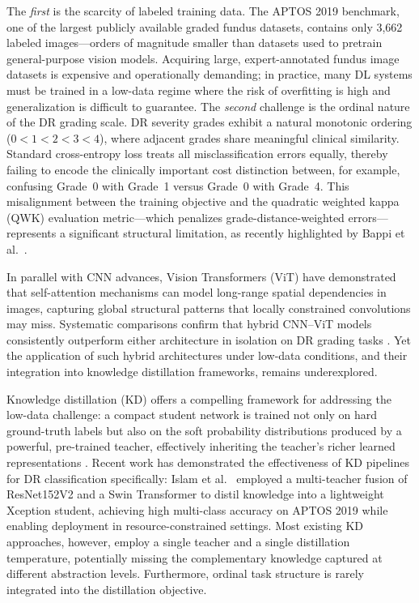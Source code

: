 \documentclass[a4paper,fleqn]{cas-dc}
\begin{document}
The \textit{first} is the scarcity of labeled training data. The APTOS 2019 benchmark, one of the largest publicly available graded fundus datasets, contains only 3,662 labeled images---orders of magnitude smaller than datasets used to pretrain general-purpose vision models. Acquiring large, expert-annotated fundus image datasets is expensive and operationally demanding; in practice, many DL systems must be trained in a low-data regime where the risk of overfitting is high and generalization is difficult to guarantee. The \textit{second} challenge is the ordinal nature of the DR grading scale. DR severity grades exhibit a natural monotonic ordering ($0 < 1 < 2 < 3 < 4$), where adjacent grades share meaningful clinical similarity. Standard cross-entropy loss treats all misclassification errors equally, thereby failing to encode the clinically important cost distinction between, for example, confusing Grade~0 with Grade~1 versus Grade~0 with Grade~4. This misalignment between the training objective and the quadratic weighted kappa (QWK) evaluation metric---which penalizes grade-distance-weighted errors---represents a significant structural limitation, as recently highlighted by Bappi et al.\ \cite{bappi2025}.

In parallel with CNN advances, Vision Transformers (ViT) \cite{dosovitskiy2021} have demonstrated that self-attention mechanisms can model long-range spatial dependencies in images, capturing global structural patterns that locally constrained convolutions may miss. Systematic comparisons confirm that hybrid CNN--ViT models consistently outperform either architecture in isolation on DR grading tasks \cite{zhang2025}. Yet the application of such hybrid architectures under low-data conditions, and their integration into knowledge distillation frameworks, remains underexplored.

Knowledge distillation (KD) offers a compelling framework for addressing the low-data challenge: a compact student network is trained not only on hard ground-truth labels but also on the soft probability distributions produced by a powerful, pre-trained teacher, effectively inheriting the teacher's richer learned representations \cite{hinton2015}. Recent work has demonstrated the effectiveness of KD pipelines for DR classification specifically: Islam et al.\ \cite{islam2023} employed a multi-teacher fusion of ResNet152V2 and a Swin Transformer to distil knowledge into a lightweight Xception student, achieving high multi-class accuracy on APTOS 2019 while enabling deployment in resource-constrained settings. Most existing KD approaches, however, employ a single teacher and a single distillation temperature, potentially missing the complementary knowledge captured at different abstraction levels. Furthermore, ordinal task structure is rarely integrated into the distillation objective.
\end{document}
